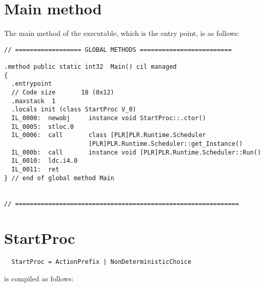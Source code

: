   \section{Main method}
  
	The main method of the executable, which is the entry point, is as follows:
	
	\begin{lstlisting}
// ================== GLOBAL METHODS =========================

.method public static int32  Main() cil managed
{
  .entrypoint
  // Code size       18 (0x12)
  .maxstack  1
  .locals init (class StartProc V_0)
  IL_0000:  newobj     instance void StartProc::.ctor()
  IL_0005:  stloc.0
  IL_0006:  call       class [PLR]PLR.Runtime.Scheduler 
                       [PLR]PLR.Runtime.Scheduler::get_Instance()
  IL_000b:  call       instance void [PLR]PLR.Runtime.Scheduler::Run()
  IL_0010:  ldc.i4.0
  IL_0011:  ret
} // end of global method Main


// =============================================================

	\end{lstlisting}	  
  \section{StartProc}
	\begin{verbatim}
  StartProc = ActionPrefix | NonDeterministicChoice 
	\end{verbatim}
	
	is compiled as follows:
	
